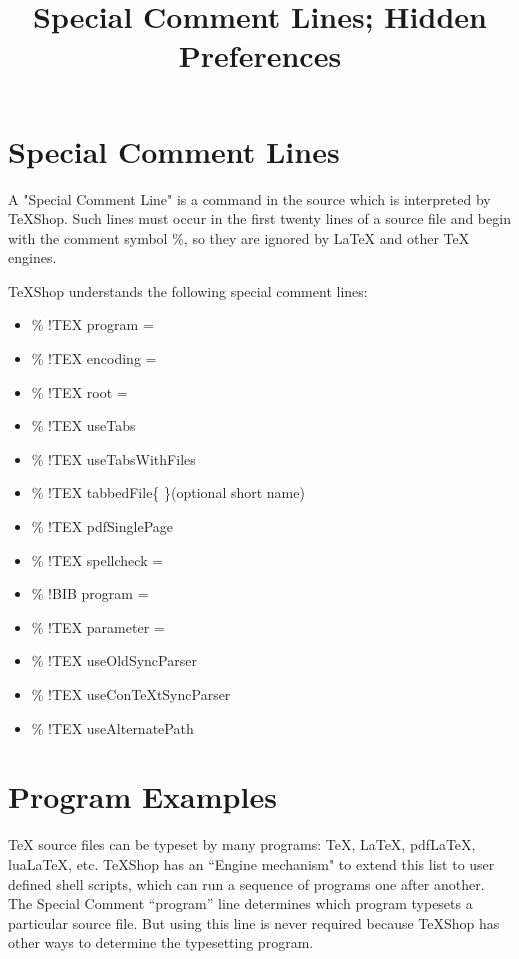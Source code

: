 \documentclass[11pt, oneside]{article}   	%
\title{Special Comment Lines; Hidden Preferences}
\date{}							%
\begin{document}
\maketitle
\section{Special Comment Lines}
A "Special Comment Line" is a command in the source which is interpreted by TeXShop. Such lines must occur in the first twenty lines of a source file and begin with the comment symbol \%, so they are ignored by LaTeX and other TeX engines.

TeXShop understands the following special comment lines:

\begin{itemize}
\item \% !TEX program =
\item \% !TEX encoding =
\item \% !TEX root =
\item \% !TEX useTabs
\item \% !TEX useTabsWithFiles
\item \% !TEX tabbedFile\{ \}(optional short name)
\item \% !TEX pdfSinglePage
\item \% !TEX spellcheck =
\item \% !BIB program =
\item \% !TEX parameter =
\item \% !TEX useOldSyncParser
\item \% !TEX useConTeXtSyncParser
\item \% !TEX useAlternatePath
\end{itemize}

\section{Program Examples}

TeX source files can be typeset by many programs: TeX, LaTeX, pdfLaTeX, luaLaTeX, etc. TeXShop has an ``Engine mechanism" to extend this list to user defined shell scripts, which can run a sequence of programs one after another. The Special Comment ``program'' line determines which program typesets a particular source file. But using this line is never required because TeXShop has other ways to determine the typesetting program.
\end{document}
